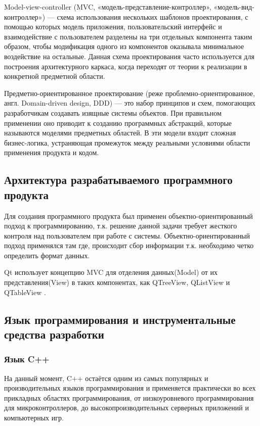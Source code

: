 Model-view-controller (MVC, «модель-представление-контроллер», «модель-вид-контроллер») — схема использования нескольких
шаблонов проектирования, с помощью которых модель приложения, пользовательский интерфейс и взаимодействие с пользователем
разделены на три отдельных компонента таким образом, чтобы модификация одного из компонентов оказывала минимальное
воздействие на остальные. Данная схема проектирования часто используется для построения архитектурного каркаса,
когда переходят от теории к реализации в конкретной предметной области.

Предметно-ориентированное проектирование (реже проблемно-ориентированное, англ. Domain-driven design, DDD) —
это набор принципов и схем, помогающих разработчикам создавать изящные системы объектов. При правильном применении
оно приводит к созданию программных абстракций, которые называются моделями предметных областей. В эти модели входит
сложная бизнес-логика, устраняющая промежуток между реальными условиями области применения продукта и кодом.

\subsection{Архитектура разрабатываемого программного продукта}

Для создания программного продукта был применен объектно-ориентированный подход к программированию,
т.к. решение данной задачи требует жесткого контроля над пользователем при работе с системы.
Объектно-ориентированный подход применялся там где, происходит сбор информации т.к. необходимо четко определить формат данных.

Qt использует концепцию MVC для отделения данных(Model) от их представления(View) в таких компонентах, как QTreeView, QListView и
QTableView \cite{qt}.

\subsection{Язык программирования и инструментальные средства разработки}

\subsubsection{Язык C++}
На данный момент, C++ остаётся одним из самых популярных и производительных языков программирования и применяется практически во всех прикладных областях
программирования, от низкоуровневого программирования для микроконтроллеров, до высокопроизводительных серверных приложений и компьютерных игр.

